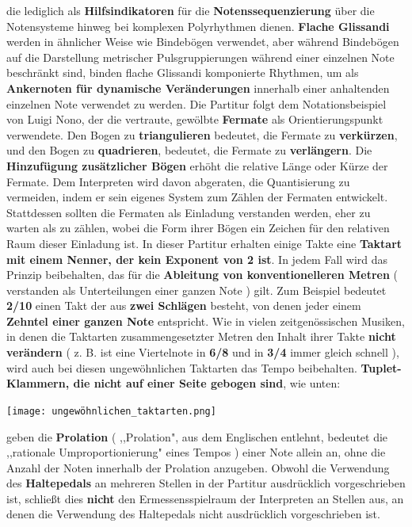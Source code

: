 \documentclass[12pt]{article}
\newcommand*\circled[1]{\tikz[baseline=(char.base)]{
            \node[shape=circle,draw,inner sep=1pt] (char) {#1};}}
\begin{document}
die lediglich als \textbf{Hilfsindikatoren} für die \textbf{Notenssequenzierung} über die Notensysteme hinweg bei komplexen Polyrhythmen dienen. \textbf{\circled{4} Flache Glissandi } werden in ähnlicher Weise wie Bindebögen verwendet, aber während Bindebögen auf die Darstellung metrischer Pulsgruppierungen während einer einzelnen Note beschränkt sind, binden flache Glissandi komponierte Rhythmen, um als \textbf{Ankernoten für dynamische Veränderungen} innerhalb einer anhaltenden einzelnen Note verwendet zu werden. \textbf{\circled{5}} Die Partitur folgt dem Notationsbeispiel von Luigi Nono, der die vertraute, gewölbte \textbf{Fermate} als Orientierungspunkt verwendete. Den Bogen zu \textbf{triangulieren} bedeutet, die Fermate zu \textbf{verkürzen}, und den Bogen zu \textbf{quadrieren}, bedeutet, die Fermate zu \textbf{verlängern}. Die \textbf{Hinzufügung zusätzlicher Bögen} erhöht die relative Länge oder Kürze der Fermate. Dem Interpreten wird davon abgeraten, die Quantisierung zu vermeiden, indem er sein eigenes System zum Zählen der Fermaten entwickelt. Stattdessen sollten die Fermaten als Einladung verstanden werden, eher zu warten als zu zählen, wobei die Form ihrer Bögen ein Zeichen für den relativen Raum dieser Einladung ist. \textbf{\circled{6}} In dieser Partitur erhalten einige Takte eine \textbf{Taktart mit einem Nenner, der kein Exponent von 2 ist}. In jedem Fall wird das Prinzip beibehalten, das für die \textbf{Ableitung von konventionelleren Metren} ( verstanden als Unterteilungen einer ganzen Note ) gilt. Zum Beispiel bedeutet \textbf{2/10} einen Takt der aus \textbf{zwei Schlägen} besteht, von denen jeder einem \textbf{Zehntel einer ganzen Note} entspricht. Wie in vielen zeitgenössischen Musiken, in denen die Taktarten zusammengesetzter Metren den Inhalt ihrer Takte \textbf{nicht verändern} ( z. B. ist eine Viertelnote in \textbf{6/8} und in \textbf{3/4} immer gleich schnell ), wird auch bei diesen ungewöhnlichen Taktarten das Tempo beibehalten. \textbf{\circled{7} Tuplet-Klammern, die nicht auf einer Seite gebogen sind}, wie unten:

\begin{center}
\texttt{[image: ungewöhnlichen\_taktarten.png]}
\end{center}

geben die \textbf{Prolation} ( ,,Prolation", aus dem Englischen entlehnt, bedeutet die ,,rationale Umproportionierung" eines Tempos ) einer Note allein an, ohne die Anzahl der Noten innerhalb der Prolation anzugeben. \textbf{\circled{8}} Obwohl die Verwendung des \textbf{Haltepedals} an mehreren Stellen in der Partitur ausdrücklich vorgeschrieben ist, schließt dies \textbf{nicht} den Ermessensspielraum der Interpreten an Stellen aus, an denen die Verwendung des Haltepedals nicht ausdrücklich vorgeschrieben ist.
\endgroup
\end{document}
